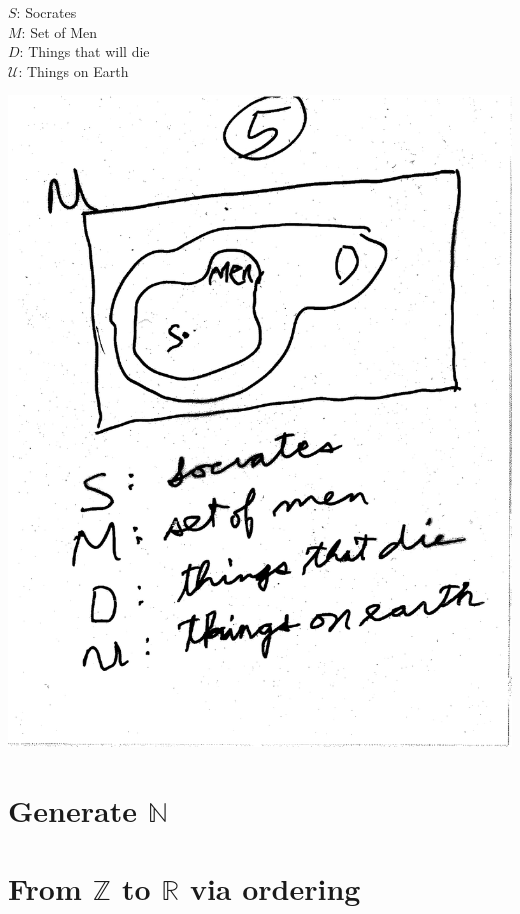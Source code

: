 \documentclass[10pt,a4paper]{article}
\begin{document}
$S$: Socrates\\
$M$: Set of Men\\
$D$: Things that will die\\
$\mathcal{U}$: Things on Earth

\includegraphics[scale=.5]{Pages/ST_5} 







\section{Generate $\mathbb{N}$}





\newpage

\section{From $\mathbb{Z}$ to $\mathbb{R}$ via ordering}
\end{document}
